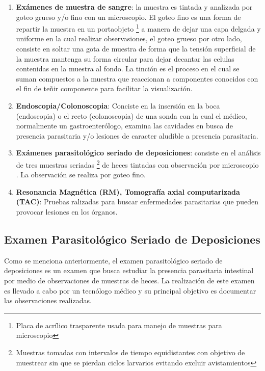\documentclass[letter,12pt]{report}
\begin{document}
\begin{enumerate}
    \item \textbf{Exámenes de muestra de sangre}: la muestra es tintada y analizada por
        goteo grueso y/o fino con un microscopio. El goteo fino es una forma de repartir
        la muestra en un portaobjeto \footnote{Placa de acrílico trasparente usada para
        manejo de muestras para microscopio} a manera de dejar una capa delgada y
        uniforme en la cual realizar observasiones, el goteo grueso por otro lado,
        consiste en soltar una gota de muestra de forma que la tensión superficial de la
        muestra mantenga su forma circular para dejar decantar las celulas contenidas en
        la muestra al fondo.  La tinción es el proceso en el cual se suman compuestos a
        la muestra que reaccionan a componentes conocidos con el fin de teñir componente
        para facilitar la visualización.
    \item \textbf{Endoscopia/Colonoscopia}: Conciste en la insersión en la boca
        (endoscopia) o el recto (colonoscopia) de una sonda con la cual el médico,
        normalmente un gastroenterólogo, examina las cavidades en busca de presencia
        parasitaria y/o lesiones de caracter aludible a presencia parasitaria.
    \item \textbf{Exámenes parasitológico seriado de deposiciones}: consiste en el
        análisis de tres muestras seriadas \footnote{Muestras tomadas con intervalos de
        tiempo equidistantes con objetivo de muestrear sin que se pierdan ciclos
        larvarios evitando excluir avistamientos} de heces tintadas con observación por
        microscopio . La observación se realiza por goteo fino.
    \item \textbf{Resonancia Magnética (RM), Tomografía axial computarizada (TAC)}:
        Pruebas ralizadas para buscar enfermedades parasitarias que pueden provocar
        lesiones en los órganos.
\end{enumerate}

\subsection{Examen Parasitológico Seriado de Deposiciones}
Como se menciona anteriormente, el examen parasitológico seriado de deposiciones es un
examen que busca estudiar la presencia parasitaria intestinal por medio de observaciones
de muestras de heces. La realización de este examen es llevado a cabo por un tecnólogo
médico y su principal objetivo es documentar las observaciones realizadas.
\end{document}
